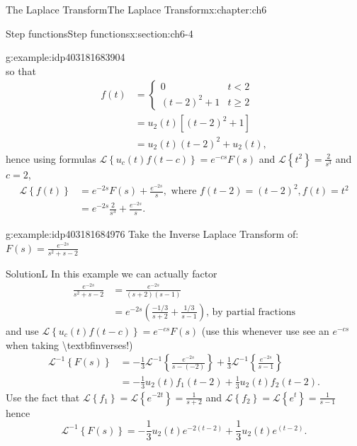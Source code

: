 \documentclass[oneside,10pt,]{book}
\numberwithin{equation}{section}
\numberwithin{equation}{section}
\newcommand{\lt}{<}
\newcommand{\amp}{&}
\begin{document}
\begin{chapterptx}{The Laplace Transform}{}{The Laplace Transform}{}{}{x:chapter:ch6}
\begin{sectionptx}{Step functions}{}{Step functions}{}{}{x:section:ch6-4}
\begin{example}{}{g:example:idp403181683904}
\begin{equation*}
\end{equation*}
so that%
\begin{align*}
f(t) \amp =\begin{cases}
0 \amp t\lt 2\\
\left(t-2\right)^{2}+1 \amp t\geq2
\end{cases}\\
\amp =u_{2}(t)\left[\left(t-2\right)^{2}+1\right]\\
\amp =u_{2}(t)\left(t-2\right)^{2}+u_{2}(t),
\end{align*}
hence using formulas \(\mathcal{L}\left\{ u_{c}(t)f\left(t-c\right)\right\} =e^{-cs}F(s)\) and \(\mathcal{L}\left\{ t^{2}\right\} =\frac{2}{s^{3}}\) and \(c=2\),%
\begin{align*}
\mathcal{L}\left\{ f(t)\right\}  \amp =e^{-2s}F(s)+\frac{e^{-2s}}{s},\,\,\text{where }f(t-2)=\left(t-2\right)^{2},f(t)=t^{2}\\
\amp =e^{-2s}\frac{2}{s^{3}}+\frac{e^{-2s}}{s}.
\end{align*}
%
\end{example}
\begin{example}{}{g:example:idp403181684976}%
Take the Inverse Laplace Transform of:\({\displaystyle F(s)=\frac{e^{-2s}}{s^{2}+s-2}}\)%
\par
SolutionL In this example we can actually factor%
\begin{align*}
\frac{e^{-2s}}{s^{2}+s-2} \amp =\frac{e^{-2s}}{\left(s+2\right)\left(s-1\right)}\\
\amp =e^{-2s}\left(\frac{-1/3}{s+2}+\frac{1/3}{s-1}\right),\,\text{by partial fractions}
\end{align*}
and use \(\mathcal{L}\left\{ u_{c}(t)f\left(t-c\right)\right\} =e^{-cs}F(s)\) (use this whenever use see an \(e^{-cs}\) when taking \textbackslash{}textbf\textbraceleft{}inverses\textbraceright{}!)%
\begin{align*}
\mathcal{L}^{-1}\left\{ F(s)\right\}  \amp =-\frac{1}{3}\mathcal{L}^{-1}\left\{ \frac{e^{-2s}}{s-(-2)}\right\} +\frac{1}{3}\mathcal{L}^{-1}\left\{ \frac{e^{-2s}}{s-1}\right\} \\
\amp =-\frac{1}{3}u_{2}(t)f_{1}\left(t-2\right)+\frac{1}{3}u_{2}(t)f_{2}\left(t-2\right).
\end{align*}
Use the fact that \(\mathcal{L}\left\{ f_{1}\right\} =\mathcal{L}\left\{ e^{-2t}\right\} =\frac{1}{s+2}\) and \(\mathcal{L}\left\{ f_{2}\right\} =\mathcal{L}\left\{ e^{t}\right\} =\frac{1}{s-1}\) hence%
\begin{equation*}
\mathcal{L}^{-1}\left\{ F(s)\right\} =-\frac{1}{3}u_{2}(t)e^{-2\left(t-2\right)}+\frac{1}{3}u_{2}(t)e^{(t-2)}.

\end{equation*}
\end{example}
\end{sectionptx}
\end{chapterptx}
\end{document}
